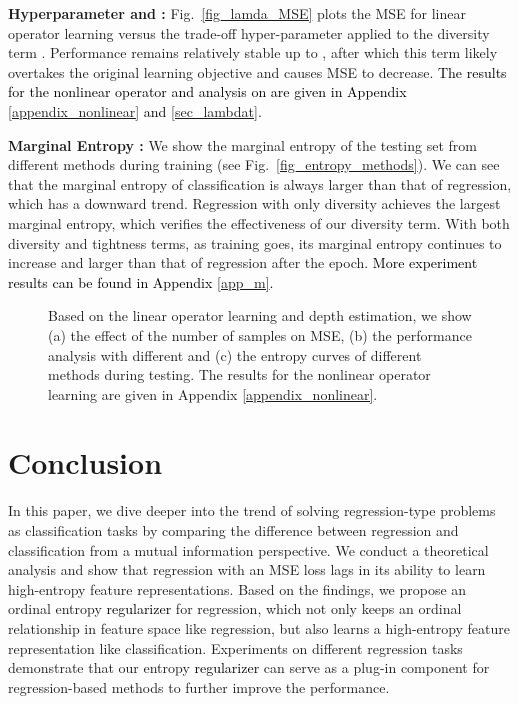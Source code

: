 \documentclass{article} \usepackage{iclr2023_conference,times}
\def\shihao{\textcolor{black}}
\begin{document}
\textbf{Hyperparameter  and :} 
Fig.~\ref{fig_lamda_MSE} plots the MSE for linear operator learning versus the trade-off hyper-parameter   applied to the diversity term .  Performance remains relatively stable up to , after which this term likely overtakes the original learning objective  and causes MSE to decrease.
\shihao{The results for the nonlinear operator and analysis on  are given in Appendix \ref{appendix_nonlinear} and \ref{sec_lambdat}.}

\textbf{Marginal Entropy :} We show the marginal
entropy of the testing set from different methods during training (see Fig.~\ref{fig_entropy_methods}). We can see that the marginal entropy of classification is always larger than that of regression, which has a downward trend. 
Regression with only diversity achieves the largest marginal entropy, which verifies the effectiveness of our diversity term.
With both diversity and tightness terms, as training goes, its marginal entropy continues to increase and larger than that of regression after the  epoch.
\shihao{More experiment results can be found in Appendix \ref{app_m}.}

\begin{figure}[!t]
	\centering
	\caption{Based on the linear operator learning and depth estimation, we show (a) the effect of the number of samples on MSE, (b) the performance analysis with different  and (c) the entropy curves of different methods during testing. The results for the nonlinear operator learning are given in Appendix \ref{appendix_nonlinear}. }
	\label{fig:ablation}
\end{figure}


\section{Conclusion}
\label{sec:conclusion}

In this paper, we dive deeper into the trend of solving regression-type problems as classification tasks by comparing the difference between regression and classification from a mutual information perspective. We conduct a theoretical analysis and show that regression with an MSE loss lags in its
ability to learn high-entropy feature representations. Based on the findings, we propose an ordinal entropy \shihao{regularizer} for regression, which not only keeps an ordinal relationship in feature space like regression, but also learns a high-entropy feature representation like classification. Experiments on different regression tasks demonstrate that our entropy \shihao{regularizer} can serve as a plug-in component for regression-based methods to further improve the performance. 
\end{document}

